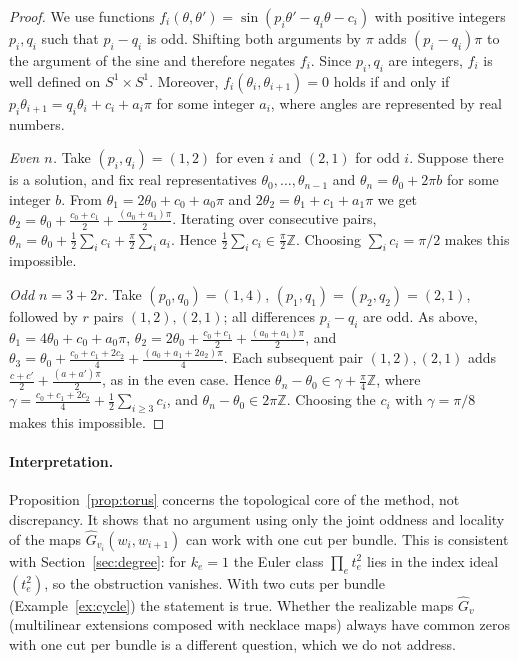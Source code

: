 \documentclass[11pt,letterpaper]{article}
\theoremstyle{definition}
\newcommand{\Z}{\mathbb{Z}}
\newcommand{\hG}{\widehat{G}}
\begin{document}
\begin{proof}
We use functions $f_i(\theta,\theta')=\sin(p_i\theta'-q_i\theta-c_i)$ with positive integers
$p_i,q_i$ such that $p_i-q_i$ is odd. Shifting both arguments by $\pi$ adds $(p_i-q_i)\pi$ to the
argument of the sine and therefore negates $f_i$. Since $p_i,q_i$ are integers, $f_i$ is
well defined on $S^1\times S^1$. Moreover, $f_i(\theta_i,\theta_{i+1})=0$ holds if and only if
$p_i\theta_{i+1}=q_i\theta_i+c_i+a_i\pi$ for some integer $a_i$, where angles are represented by
real numbers.

\emph{Even $n$.} Take $(p_i,q_i)=(1,2)$ for even $i$ and $(2,1)$ for odd $i$. Suppose there is a
solution, and fix real representatives $\theta_0,\dots,\theta_{n-1}$ and $\theta_n=\theta_0+2\pi b$
for some integer $b$. From $\theta_1=2\theta_0+c_0+a_0\pi$ and $2\theta_2=\theta_1+c_1+a_1\pi$ we
get $\theta_2=\theta_0+\frac{c_0+c_1}2+\frac{(a_0+a_1)\pi}2$. Iterating over consecutive pairs,
$\theta_n=\theta_0+\frac12\sum_ic_i+\frac\pi2\sum_ia_i$. Hence
$\frac12\sum_ic_i\in\frac\pi2\Z$. Choosing $\sum_ic_i=\pi/2$ makes this impossible.

\emph{Odd $n=3+2r$.} Take $(p_0,q_0)=(1,4)$, $(p_1,q_1)=(p_2,q_2)=(2,1)$, followed by $r$ pairs
$(1,2),(2,1)$; all differences $p_i-q_i$ are odd. As above,
$\theta_1=4\theta_0+c_0+a_0\pi$, $\theta_2=2\theta_0+\frac{c_0+c_1}2+\frac{(a_0+a_1)\pi}2$, and
$\theta_3=\theta_0+\frac{c_0+c_1+2c_2}4+\frac{(a_0+a_1+2a_2)\pi}4$. Each subsequent pair
$(1,2),(2,1)$ adds $\frac{c+c'}2+\frac{(a+a')\pi}2$, as in the even case. Hence
$\theta_n-\theta_0\in\gamma+\frac\pi4\Z$, where
$\gamma=\frac{c_0+c_1+2c_2}4+\frac12\sum_{i\ge3}c_i$, and $\theta_n-\theta_0\in2\pi\Z$. Choosing the
$c_i$ with $\gamma=\pi/8$ makes this impossible.
\end{proof}

\paragraph{Interpretation.}
Proposition~\ref{prop:torus} concerns the topological core of the method, not discrepancy. It
shows that no argument using only the joint oddness and locality of the maps
$\hG_{v_i}(w_i,w_{i+1})$ can work with one cut per bundle. This is consistent with
Section~\ref{sec:degree}: for $k_e=1$ the Euler class $\prod_et_e^2$ lies in the index ideal
$(t_e^2)$, so the obstruction vanishes. With two cuts per bundle (Example~\ref{ex:cycle}) the
statement is true. Whether the realizable maps $\hG_v$ (multilinear extensions composed with
necklace maps) always have common zeros with one cut per bundle is a different question, which we
do not address.
\end{document}
